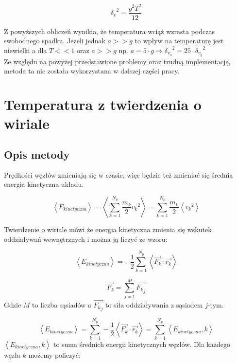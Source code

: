 \documentclass[12pt, letterpaper]{report}
\begin{document}
    \begin{equation}
        {\delta_v}^2  =  \frac{g^2 T^2}{12}
    \end{equation}

    Z powyższych obliczeń wynikia, że temperatura wciąż wzrasta podczas swobodnego spadku. 
    Jeżeli jednak $a >> g$ to wpływ na temperaturę jest niewielki a dla $T << 1$ oraz $a >> g$ 
    np. $a = 5 \cdot g \Rightarrow {\delta_{v_a}}^2 = 25 \cdot {\delta_{v_g}}^2$ \\

    Ze względu na powyżej przedstawione problemy oraz trudną implementację, metoda ta nie została wykorzystana
    w dalszej części pracy.

    \section{Temperatura z twierdzenia o wiriale}
    \subsection{Opis metody}
    Prędkości węzłów zmieniają się w czasie, więc będzie też zmieniać się średnia energia kinetyczna układu.

    \begin{equation}
        \left< E_{kinetyczna} \right>  =  \left< \sum_{k = 1}^{N_p} \frac{m_k}{2} {v_k}^2 \right>
        = \sum_{k = 1}^{N_p} \frac{m_k}{2} \left< {v_k}^2 \right>
    \end{equation}

    Twierdzenie o wiriale mówi że energia kinetyczna zmienia się wskutek oddziaływań wewnętrznych i można ją 
    liczyć ze wzoru:

    \begin{equation}
        \left< E_{kinetyczna} \right>  = 
         - \frac{1}{2} \sum_{k = 1}^{N_p} \left< \vec{F_k} \cdot \vec{r_k} \right>
    \end{equation}

    \begin{equation}
        \vec{F_k} = \sum_{j = 1}^{M} \vec{{F_k}_j}
    \end{equation}
    Gdzie $M$ to liczba sąsiadów a $\vec{{F_k}_j}$ to siła oddziaływania z sąsiadem $j$-tym.

    \begin{equation}
        \left< E_{kinetyczna} \right> = 
        \sum_{k = 1}^{N_p} -\frac{1}{2} \left< \vec{F_k} \cdot \vec{r_k} \right> =
        \sum_{k = 1}^{N_p} \left< E_{kinetyczna} , k \right>
    \end{equation}
    $\left< E_{kinetyczna} , k \right>$ to suma średnich energii kinetycznych węzłów. Dla każdego węzła $k$ możemy policzyć:
\end{document}
